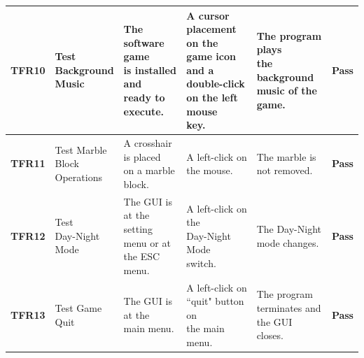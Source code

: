 \documentclass[12pt, titlepage]{article}
\begin{document}
\begin{center}
\begin{longtable}[!bpht]{|m{1.3cm}|m{2.3cm}|m{3.4cm}|m{3.4cm}|m{3.4cm}|m{1cm}|}
\textbf{TFR10} & \makecell[ml]{Test\\ Background\\ Music} & \makecell[ml]{The software game\\ is installed and\\ ready to execute.} & \makecell[ml]{A cursor placement\\ on the game icon\\ and a double-click\\ on the left mouse\\ key.} & \makecell[ml]{The program plays\\ the background\\ music of the game.} & \textbf{Pass}\\\hline

\textbf{TFR11} & \makecell[ml]{Test Marble\\ Block\\ Operations} & \makecell[ml]{A \hspace{-0.5mm}crosshair \hspace{-0.5mm}is \hspace{-0.5mm}placed\\ on a marble block.} & \makecell[ml]{A left-click on\\ the mouse.} & \makecell[ml]{The marble is\\ not removed.} & \textbf{Pass}\\\hline

\textbf{TFR12} & \makecell[ml]{Test\\ Day-Night\\ Mode} & \makecell[ml]{The GUI is at the\\ setting menu or at\\ the ESC menu.} & \makecell[ml]{A left-click on the\\ Day-Night Mode\\ switch.} & \makecell[ml]{The Day-Night\\ mode changes.} & \textbf{Pass}\\\hline

\textbf{TFR13} & \makecell[ml]{Test Game\\ Quit} & \makecell[ml]{The GUI is at the\\ main menu.} & \makecell[ml]{A left-click on\\``quit" button on\\ the main menu.} & \makecell[ml]{The program\\ terminates and\\ the GUI closes.} & \textbf{Pass}\\\hline


\end{longtable}
\end{center}
\end{document}
